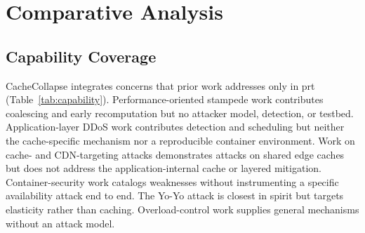 \documentclass[preprint,12pt]{elsarticle}
\begin{document}
\section{Comparative Analysis}
\label{sec:comparative}

\subsection{Capability Coverage}
CacheCollapse integrates concerns that prior work addresses only in prt
(Table~\ref{tab:capability}). Performance-oriented stampede work
\cite{vattani2015,nishtala2013} contributes coalescing and early recomputation but no
attacker model, detection, or testbed. Application-layer DDoS work
\cite{praseed2019,xie2009,ranjan2009} contributes detection and scheduling but neither
the cache-specific mechanism nor a reproducible container environment. Work on
cache- and CDN-targeting attacks \cite{nguyen2019,guo2020,triukose2009} demonstrates
attacks on shared edge caches but does not address the application-internal cache or
layered mitigation. Container-security work \cite{combe2016,sultan2019} catalogs
weaknesses without instrumenting a specific availability attack end to end. The Yo-Yo
attack \cite{sides2016,bremlerbarr2017} is closest in spirit but targets elasticity
rather than caching. Overload-control work \cite{welsh2001,welsh2003} supplies general
mechanisms without an attack model.
\end{document}
